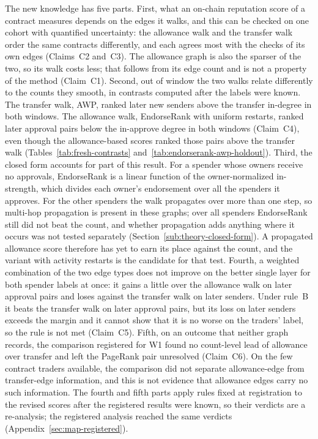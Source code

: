 The new knowledge has five parts. First, what an on-chain reputation score of a contract measures depends on the edges it walks, and this can be checked on one cohort with quantified uncertainty: the allowance walk and the transfer walk order the same contracts differently, and each agrees most with the checks of its own edges (Claims~C2 and~C3). The allowance graph is also the sparser of the two, so its walk costs less; that follows from its edge count and is not a property of the method (Claim~C1). Second, out of window the two walks relate differently to the counts they smooth, in contrasts computed after the labels were known. The transfer walk, AWP, ranked later new senders above the transfer in-degree in both windows. The allowance walk, EndorseRank with uniform restarts, ranked later approval pairs below the in-approve degree in both windows (Claim~C4), even though the allowance-based scores ranked those pairs above the transfer walk (Tables~\ref{tab:fresh-contrasts} and~\ref{tab:endorserank-awp-holdout}). Third, the closed form accounts for part of this result. For a spender whose owners receive no approvals, EndorseRank is a linear function of the owner-normalized in-strength, which divides each owner's endorsement over all the spenders it approves. For the other spenders the walk propagates over more than one step, so multi-hop propagation is present in these graphs; over all spenders EndorseRank still did not beat the count, and whether propagation adds anything where it occurs was not tested separately (Section~\ref{sub:theory-closed-form}). A propagated allowance score therefore has yet to earn its place against the count, and the variant with activity restarts is the candidate for that test. Fourth, a weighted combination of the two edge types does not improve on the better single layer for both spender labels at once: it gains a little over the allowance walk on later approval pairs and loses against the transfer walk on later senders. Under rule~B it beats the transfer walk on later approval pairs, but its loss on later senders exceeds the margin and it cannot show that it is no worse on the traders' label, so the rule is not met (Claim~C5). Fifth, on an outcome that neither graph records, the comparison registered for W1 found no count-level lead of allowance over transfer and left the PageRank pair unresolved (Claim~C6). On the few contract traders available, the comparison did not separate allowance-edge from transfer-edge information, and this is not evidence that allowance edges carry no such information. The fourth and fifth parts apply rules fixed at registration to the revised scores after the registered results were known, so their verdicts are a re-analysis; the registered analysis reached the same verdicts (Appendix~\ref{sec:map-registered}).

